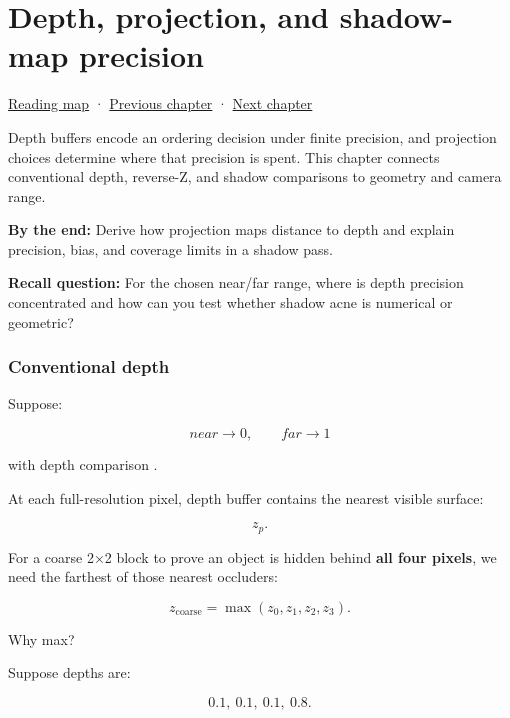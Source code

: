 \chapter{Depth, projection, and shadow-map precision}\label{06-engine-ii-ch030-depth-projection-and-shadow-map-precision}\hypertarget{06-engine-ii-ch030}{}\label{stagechapter:06-engine-ii-ch030}

\hypertarget{06-engine-ii-ch030-depth-projection-and-shadow-map-precision}{}

\hyperref[volume-reading-map]{Reading map} · \hyperref[03-visual-computing-i-ch013]{Previous chapter} · \hyperref[04-visual-computing-ii-ch033]{Next chapter}

Depth buffers encode an ordering decision under finite precision, and projection choices determine where that precision is spent. This chapter connects conventional depth, reverse-Z, and shadow comparisons to geometry and camera range.

\textbf{By the end:} Derive how projection maps distance to depth and explain precision, bias, and coverage limits in a shadow pass.

\textbf{Recall question:} For the chosen near/far range, where is depth precision concentrated and how can you test whether shadow acne is numerical or geometric?

\subsection{Conventional depth}\label{06-engine-ii-ch030-conventional-depth}

\hypertarget{06-engine-ii-ch030-conventional-depth}{}

Suppose:

\[
near\rightarrow0,
\qquad
far\rightarrow1
\]

with depth comparison .

At each full-resolution pixel, depth buffer contains the nearest visible surface:

\[
z_p.
\]

For a coarse 2×2 block to prove an object is hidden behind \textbf{all four pixels}, we need the farthest of those nearest occluders:

\[
\boxed{
z_{\text{coarse}}
=
\max(z_0,z_1,z_2,z_3).
}
\]

Why max?

Suppose depths are:

\[
0.1,\ 0.1,\ 0.1,\ 0.8.
\]

